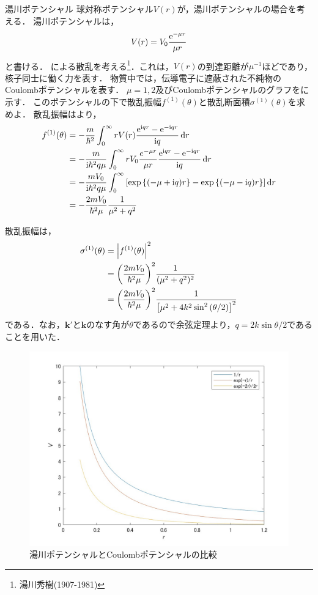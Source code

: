 \documentclass{report}
\begin{document}
  \begin{myex}{湯川ポテンシャル}{}
    球対称ポテンシャル$V(r)$が，湯川ポテンシャルの場合を考える．
    湯川ポテンシャルは，
    \begin{align}
      V(r) = V_0 \frac{\mathrm{e}^{-\mu r}}{\mu r}
    \end{align}
    と書ける．
    による散乱を考える\footnote{湯川秀樹(1907-1981)}．これは，$V(r)$の到達距離が$\mu^{-1}$ほどであり，核子同士に働く力を表す．
    物質中では，伝導電子に遮蔽された不純物のCoulombポテンシャルを表す．
    $\mu = 1,2$及びCoulombポテンシャルのグラフをに示す．
    このポテンシャルの下で散乱振幅$f^{(1)}(\theta)$と散乱断面積$\sigma^{(1)}(\theta)$を求めよ．
    \tcblower
    散乱振幅はより，
    \begin{align}
      f^{(1)}(\theta) &= -\frac{m}{\hbar^2} \int_{0}^{\infty} rV(r) \frac{\mathrm{e}^{\mathrm{i} qr} - \mathrm{e}^{-\mathrm{i} qr}}{\mathrm{i} q} \dd{r} \\ 
      &= -\frac{m}{\mathrm{i} \hbar^2 q \mu} \int_{0}^{\infty} rV_0\frac{e^{-\mu r}}{\mu r} \frac{\mathrm{e}^{\mathrm{i} qr} - \mathrm{e}^{-\mathrm{i} qr}}{\mathrm{i} q}\dd{r} \\
      &= -\frac{mV_0}{\mathrm{i} \hbar^2 q \mu} \int_{0}^{\infty} \qty[\exp\qty{(-\mu + \mathrm{i}q)r} - \exp\qty{(-\mu - \mathrm{i}q)r}] \dd{r} \\
      &= - \frac{2m V_0}{\hbar^2 \mu} \frac{1}{\mu^2 + q^2}
    \end{align}
    \par
    散乱振幅は，
    \begin{align}
      \sigma^{(1)}(\theta) &= \abs{f^{(1)}(\theta)}^2\\
      &= \qty(\frac{2m V_0}{\hbar^2 \mu})^2 \frac{1}{(\mu^2 + q^2)^2}\\
      &= \qty(\frac{2m V_0}{\hbar^2 \mu})^2 \frac{1}{\qty[\mu^2 + 4k^2 \sin^2\qty(\theta/2)]^2}
    \end{align}
    である．なお，$\bm{k'}$と$\bm{k}$のなす角が$\theta$であるので余弦定理より，$q = 2k\sin\theta/2$であることを用いた．
    \begin{figure}[H]
      \centering
      \includegraphics[width = 0.5\columnwidth]{fig/yukawa_potential.jpg}
      \caption{湯川ポテンシャルとCoulombポテンシャルの比較}\label{yukawa-potential-graph}
    \end{figure}
  \end{myex}
\end{document}
